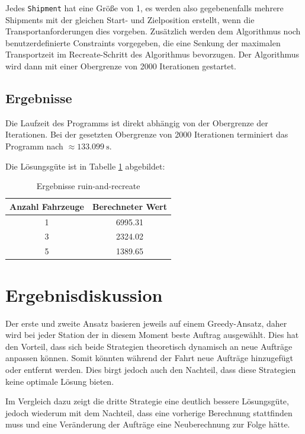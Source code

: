 \documentclass[ngerman]{tudscrreprt}
\newcommand{\code}[1]{\texttt{#1}}
\begin{document}
Jedes \code{Shipment} hat eine Größe von \num{1}, es werden also gegebenenfalls mehrere
Shipments mit der gleichen Start- und Zielposition erstellt, wenn die
Transportanforderungen dies vorgeben. Zusätzlich werden dem Algorithmus noch
benutzerdefinierte Constraints vorgegeben, die eine Senkung der maximalen Transportzeit
im Recreate-Schritt des Algorithmus bevorzugen. Der Algorithmus wird dann mit einer
Obergrenze von \num{2000} Iterationen gestartet.

\subsection{Ergebnisse}
Die Laufzeit des Programms ist direkt abhängig von der Obergrenze der Iterationen. Bei
der gesetzten Obergrenze von \num{2000} Iterationen terminiert das Programm nach
$\approx \SI{133.099}{\second}$.

Die Lösungsgüte ist in Tabelle \ref{table:ruin-and-recreate} abgebildet:
%
\begin{table}[H]
    \centering
    \begin{tabular}{|c|c|}
    \hline
    Anzahl Fahrzeuge & Berechneter Wert \\ \hline
    1                & \num{6995.31}    \\ \hline
    3                & \num{2324.02}    \\ \hline
    5                & \num{1389.65}    \\ \hline
    \end{tabular}
    \caption{Ergebnisse ruin-and-recreate}
    \label{table:ruin-and-recreate}
\end{table}

\section{Ergebnisdiskussion}
Der erste und zweite Ansatz basieren jeweils auf einem Greedy-Ansatz, daher wird bei
jeder Station der in diesem Moment beste Auftrag ausgewählt. Dies hat den Vorteil, dass
sich beide Strategien theoretisch dynamisch an neue Aufträge anpassen können. Somit
könnten während der Fahrt neue Aufträge hinzugefügt oder entfernt werden. Dies birgt
jedoch auch den Nachteil, dass diese Strategien keine optimale Lösung bieten.

Im Vergleich dazu zeigt die dritte Strategie eine deutlich bessere Lösungsgüte,
jedoch wiederum mit dem Nachteil, dass eine vorherige Berechnung stattfinden muss und eine
Veränderung der Aufträge eine Neuberechnung zur Folge hätte.
\end{document}
